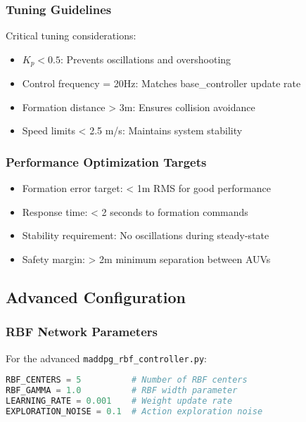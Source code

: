 \documentclass[11pt,a4paper]{article}
\begin{document}
\subsubsection{Tuning Guidelines}

Critical tuning considerations:
\begin{itemize}
    \item $K_p < 0.5$: Prevents oscillations and overshooting
    \item Control frequency = 20Hz: Matches base\_controller update rate
    \item Formation distance > 3m: Ensures collision avoidance
    \item Speed limits < 2.5 m/s: Maintains system stability
\end{itemize}

\subsubsection{Performance Optimization Targets}

\begin{itemize}
    \item Formation error target: < 1m RMS for good performance
    \item Response time: < 2 seconds to formation commands
    \item Stability requirement: No oscillations during steady-state
    \item Safety margin: > 2m minimum separation between AUVs
\end{itemize}

\subsection{Advanced Configuration}

\subsubsection{RBF Network Parameters}

For the advanced \texttt{maddpg\_rbf\_controller.py}:

\begin{lstlisting}[language=python, caption=RBF Configuration Parameters]
RBF_CENTERS = 5          # Number of RBF centers
RBF_GAMMA = 1.0          # RBF width parameter
LEARNING_RATE = 0.001    # Weight update rate
EXPLORATION_NOISE = 0.1  # Action exploration noise
\end{lstlisting}
\end{document}
